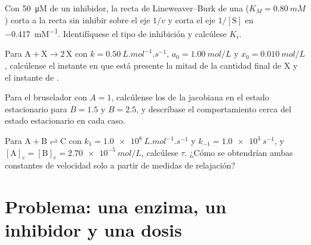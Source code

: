 \begin{exercise}[$\star\star$]\label{exo:b3:complex-kinetics:9}
Con \qty{50}{\micro M} de un inhibidor, la recta de Lineweaver--Burk de una 
($K_M = \qty{0.80}{mM}$) corta a la recta sin inhibir sobre el eje $1/v$ y corta el
eje $1/[\mathrm S]$ en \qty{-0.417}{mM^{-1}}. Identifíquese el tipo de inhibición y calcúlese $K_i$.
\end{exercise}

\begin{exercise}[$\star\star\star$]\label{exo:b3:complex-kinetics:10}
Para $\mathrm{A + X \to 2\,X}$ con $k = \qty{0.50}{L.mol^{-1}.s^{-1}}$, $a_0 = \qty{1.00}{mol/L}$ y $x_0 = \qty{0.010}{mol/L}$,
calcúlense el instante en que está presente la mitad de la cantidad final de X y el
instante de .
\end{exercise}

\begin{exercise}[$\star\star\star$]\label{exo:b3:complex-kinetics:11}
Para el bruselador con $A = 1$, calcúlense los  de la jacobiana en
el estado estacionario para $B = 1.5$ y $B = 2.5$, y descríbase el comportamiento cerca del
estado estacionario en cada caso.
\end{exercise}

\begin{exercise}[$\star\star\star$]\label{exo:b3:complex-kinetics:12}
Para $\mathrm{A + B \rightleftharpoons C}$ con $k_1 = \qty{1.0e8}{L.mol^{-1}.s^{-1}}$ y $k_{-1} = \qty{1.0e3}{s^{-1}}$, y
$[\mathrm A]_e = [\mathrm B]_e = \qty{2.70e-5}{mol/L}$, calcúlese $\tau$. ¿Cómo se obtendrían ambas constantes de velocidad
solo a partir de medidas de relajación?
\end{exercise}

\section{Problema: una enzima, un inhibidor y una dosis}

